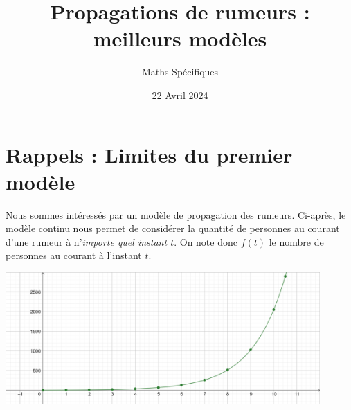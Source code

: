 \documentclass{exam}
\title{Propagations de rumeurs : meilleurs modèles}
\date{22 Avril 2024}
\author{Maths Spécifiques}
\begin{document}
\maketitle\thispagestyle{head}
\section{Rappels : Limites du premier modèle}
Nous sommes intéressés par un modèle de propagation des rumeurs. Ci-après, le modèle continu nous permet de considérer la quantité de personnes au courant d'une rumeur à n'\emph{importe quel instant $t$}. On note donc $f(t)$ le nombre de personnes au courant à l'instant $t$.
\begin{center}
\includegraphics[width=0.9\textwidth]{Modele.png}
\end{center}
\end{document}
